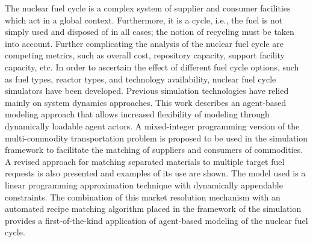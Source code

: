 \vcinfo{}

The nuclear fuel cycle is a complex system of supplier and consumer facilities
which act in a global context. Furthermore, it is a cycle, i.e., the fuel is not
simply used and disposed of in all cases; the notion of recycling must be taken
into account. Further complicating the analysis of the nuclear fuel cycle are
competing metrics, such as overall cost, repository capacity, support facility
capacity, etc. In order to ascertain the effect of different fuel cycle options,
such as fuel types, reactor types, and technology availability, nuclear fuel
cycle simulators have been developed. Previous simulation technologies have
relied mainly on system dynamics approaches. This work describes an agent-based
modeling approach that allows increased flexibility of modeling through
dynamically loadable agent actors. A mixed-integer programming version of the
multi-commodity transportation problem is proposed to be used in the simulation
framework to facilitate the matching of suppliers and consumers of
commodities. A revised approach for matching separated materials to multiple
target fuel requests is also presented and examples of its use are shown. The
model used is a linear programming approximation technique with dynamically
appendable constraints. The combination of this market resolution mechanism with
an automated recipe matching algorithm placed in the framework of the \Cyclus
simulation provides a first-of-the-kind application of agent-based modeling of
the nuclear fuel cycle.
